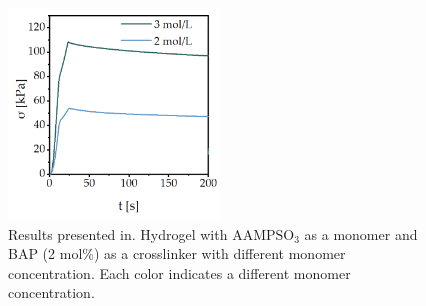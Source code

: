 \begin{figure}[ht!]
    \centering
    \includegraphics[width=0.5\textwidth]{figs/mechResponse/2-c.png}
    \caption{
        Results presented in\citep{romischkeSwellingMechanicalCharacterization2022}. 
        Hydrogel with $\mathrm{AAMPSO}_3$ as a monomer and BAP (2 mol\%) as a crosslinker with different monomer concentration.
    Each color indicates a different monomer concentration. 
}\label{fig:mechResponseEnd1}
\end{figure}



